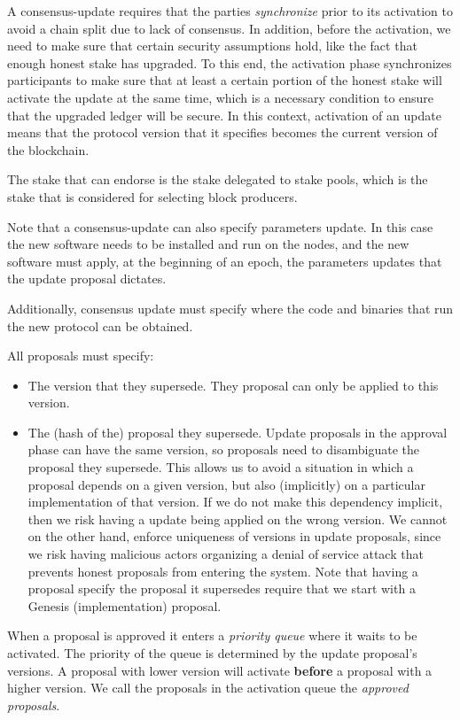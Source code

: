 A consensus-update requires that the parties \emph{synchronize} prior to its
activation to avoid a chain split due to lack of consensus. In addition, before
the activation, we need to make sure that certain security assumptions hold,
like the fact that enough honest stake has upgraded.
%
To this end, the activation phase synchronizes participants to make sure that at
least a certain portion of the honest stake will activate the update at the same
time, which is a necessary condition to ensure that the upgraded ledger will be
secure.
%
In this context, activation of an update means that the protocol version that it
specifies becomes the current version of the blockchain.

The stake that can endorse is the stake delegated to stake pools, which is the
stake that is considered for selecting block producers.

Note that a consensus-update can also specify parameters update. In this case
the new software needs to be installed and run on the nodes, and the new
software must apply, at the beginning of an epoch, the parameters updates that
the update proposal dictates.

Additionally, consensus update must specify where the code and binaries that
run the new protocol can be obtained.

All proposals must specify:
\begin{itemize}
\item The version that they supersede. They proposal can only be applied to this
  version.
\item The (hash of the) proposal they supersede. Update proposals in the
  approval phase can have the same version, so proposals need to disambiguate
  the proposal they supersede. This allows us to avoid a situation in which a
  proposal depends on a given version, but also (implicitly) on a particular
  implementation of that version. If we do not make this dependency implicit,
  then we risk having a update being applied on the wrong version.
  We cannot on the other hand, enforce uniqueness of versions in update
  proposals, since we risk having malicious actors organizing a denial of
  service attack that prevents honest proposals from entering the system.
  Note that having a proposal specify the proposal it supersedes require that we
  start with a Genesis (implementation) proposal.
\end{itemize}

When a proposal is approved it enters a \emph{priority queue} where it waits to
be activated. The priority of the queue is determined by the update proposal's
versions. A proposal with lower version will activate \textbf{before} a proposal
with a higher version.
%
We call the proposals in the activation queue the \emph{approved proposals}.

